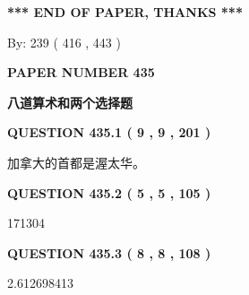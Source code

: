 \documentclass{ctexart}
\begin{document}
\vspace{1.0in} 
{\textbf{\large{ *** END OF PAPER, THANKS *** }}} 
   
   
\hspace{1.0in} By: 
 239 ( 416 ,  443 )
   
   
   
   
\newpage 
\setcounter{page}{ 
   435001 } 
   
   
   
   
 {\textbf{ \Large{ PAPER NUMBER  435  }}}
   
   
\vspace{0.2in}
   
   
   
   
   
   
 \vspace{0.2in}
{\LARGE {\textbf{ 八道算术和两个选择题}}}
   
   
  
\vspace{0.2in}
  
{\textbf{\Large{QUESTION
435.1 
 ( 9 , 9 , 201 )
}}}
  
  
 
 
\noindent{}
 
 
加拿大的首都是渥太华。
 
 
 
 
  
\vspace{0.2in}
  
{\textbf{\Large{QUESTION
435.2 
 ( 5 , 5 , 105 )
}}}
  
  
 
 
\noindent{}

171304
 
 
  
\vspace{0.2in}
  
{\textbf{\Large{QUESTION
435.3 
 ( 8 , 8 , 108 )
}}}
  
  
 
 
\noindent{}

2.612698413
 
 
  
\vspace{0.2in}
  
\end{document}
